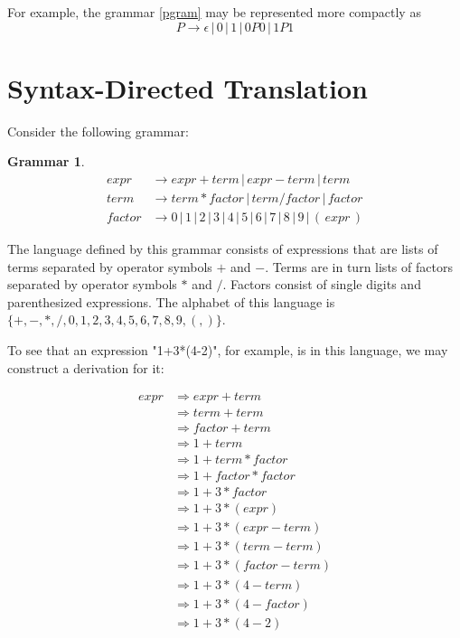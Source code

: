 \documentclass[a4paper,oneside,11pt]{book}
\theoremstyle{definition}
\newtheorem{grmr}{Grammar}[section]
\begin{document}
For example, the grammar \ref{pgram} may be represented more compactly as
$$P \rightarrow \epsilon \, | \, 0 \, | \, 1 \, | \, 0P0 \, | \, 1P1$$

\clearpage

\section{Syntax-Directed Translation}

Consider the following grammar:

\begin{grmr}\label{g:infix}
\begin{align*}
expr &\rightarrow expr + term\, |\, expr - term \,| \, term\\
term &\rightarrow term * factor\, |\, term / factor \, | \, factor\\
factor &\rightarrow 0\,|\,1\,|\,2\,|\,3\,|\,4\,|\,5\,|\,6\,|\,7\,|\,8\,|\,9\,|\,(\, expr \,)
\end{align*}
\end{grmr}

The language defined by this grammar consists of expressions that are lists of terms separated by
operator symbols $+$ and $-$. Terms are in turn lists of factors separated by operator symbols $*$ and $/$.
Factors consist of single digits and parenthesized expressions.
The alphabet of this language is $\{+, -, *, /, 0, 1, 2, 3, 4, 5, 6, 7, 8, 9, (, ) \}$.

To see that an expression "1+3*(4-2)", for example, is in this language, we may construct a
derivation for it:

\begin{align*}
expr &\Rightarrow expr + term\\
&\Rightarrow term + term\\
&\Rightarrow factor + term\\
&\Rightarrow 1 + term\\
&\Rightarrow 1 + term * factor\\
&\Rightarrow 1 + factor * factor\\
&\Rightarrow 1 + 3 * factor\\
&\Rightarrow 1 + 3 * ( expr )\\
&\Rightarrow 1 + 3 * ( expr - term )\\
&\Rightarrow 1 + 3 * ( term - term )\\
&\Rightarrow 1 + 3 * ( factor - term )\\
&\Rightarrow 1 + 3 * ( 4 - term )\\
&\Rightarrow 1 + 3 * ( 4 - factor )\\
&\Rightarrow 1 + 3 * ( 4 - 2 )\\
\end{align*}
\end{document}
